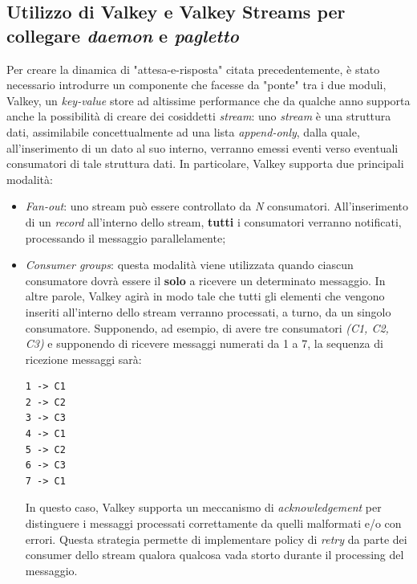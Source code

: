 \subsection{Utilizzo di Valkey e Valkey Streams per collegare \textit{daemon} e \textit{pagletto}}
Per creare la dinamica di "attesa-e-risposta" citata precedentemente, è stato necessario introdurre un componente che facesse da "ponte" tra i due moduli, Valkey,  un \textit{key-value} store ad altissime performance che da qualche anno supporta anche la possibilità di creare dei cosiddetti \textit{stream}: uno \textit{stream} è una struttura dati, assimilabile concettualmente ad una lista \textit{append-only}, dalla quale, all'inserimento di un dato al suo interno, verranno emessi eventi verso eventuali consumatori di tale struttura dati.\newline
In particolare, Valkey supporta due principali modalità:
\begin{itemize}
    \item \textit{Fan-out}: uno stream può essere controllato da \textit{N} consumatori. All'inserimento di un \textit{record} all'interno dello stream, \textbf{tutti} i consumatori verranno notificati, processando il messaggio parallelamente;
    \item \textit{Consumer groups}: questa modalità viene utilizzata quando ciascun consumatore dovrà essere il \textbf{solo} a ricevere un determinato messaggio. In altre parole, Valkey agirà in modo tale che tutti gli elementi che vengono inseriti all'interno dello stream verranno processati, a turno, da un singolo consumatore. Supponendo, ad esempio, di avere tre consumatori \textit{(C1, C2, C3)} e supponendo di ricevere messaggi numerati da 1 a 7, la sequenza di ricezione messaggi sarà:
        \begin{verbatim}
1 -> C1
2 -> C2
3 -> C3
4 -> C1
5 -> C2
6 -> C3
7 -> C1
        \end{verbatim}
    In questo caso, Valkey supporta un meccanismo di \textit{acknowledgement} per distinguere i messaggi processati correttamente da quelli malformati e/o con errori. Questa strategia permette di implementare policy di \textit{retry} da parte dei consumer dello stream qualora qualcosa vada storto durante il processing del messaggio.
\end{itemize}

